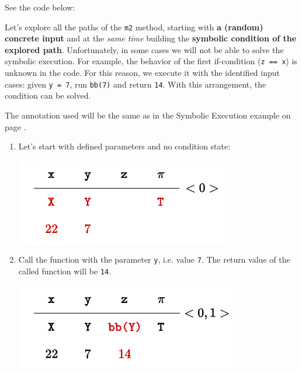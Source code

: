\begin{examplebox}
    See the code below:
    
    Let's explore all the paths of the \texttt{m2} method, starting with \textbf{a (random) concrete input} and at the \emph{same time} building the \textbf{symbolic condition of the explored path}. Unfortunately, in some cases we will not be able to solve the symbolic execution. For example, the behavior of the first if-condition (\texttt{z == x}) is unknown in the code. For this reason, we execute it with the identified input cases: given \texttt{y = 7}, run \texttt{bb(7)} and return \texttt{14}. With this arrangement, the condition can be solved.

    The annotation used will be the same as in the Symbolic Execution example on page \pageref{example: Symbolic Execution}.

    \begin{enumerate}
        \item Let's start with defined parameters and no condition state:
        \begin{center}
            \includegraphics[width=.5\textwidth]{img/concolic-execution-1.pdf}
        \end{center}

        \newpage

        \item Call the function with the parameter \texttt{y}, i.e. value \texttt{7}. The return value of the called function will be \texttt{14}.
        \begin{center}
            \includegraphics[width=.5\textwidth]{img/concolic-execution-2.pdf}
        \end{center}


\end{enumerate}
\end{examplebox}
